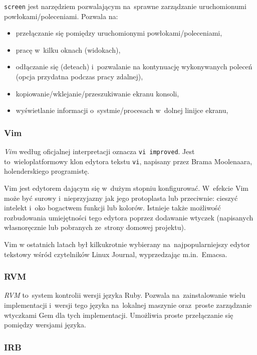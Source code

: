 \texttt{screen}\cite{screen} jest narzędziem pozwalającym na~sprawne zarządzanie uruchomionumi powłokami/poleceniami. Pozwala na:

\begin{itemize}
  \item przełączanie się pomiędzy uruchomionymi powłokami/poleceniami,
  \item pracę w~kilku oknach (widokach),
  \item odłączanie się (deteach) i~pozwalanie na kontynuację wykonywanych poleceń (opcja przydatna podczas pracy zdalnej),
  \item kopiowanie/wklejanie/przeszukiwanie ekranu konsoli,
  \item wyświetlanie informacji o~systmie/procesach w~dolnej linijce ekranu,
\end{itemize}

\subsubsection{Vim}

\textit{Vim}\cite{vim} według oficjalnej interpretacji oznacza \texttt{vi improved}. Jest to~wieloplatformowy klon edytora tekstu \texttt{vi}, napisany przez Brama Moolenaara, holenderskiego programistę.


Vim jest edytorem dającym się w~dużym stopniu konfigurować. W~efekcie Vim może być surowy i~nieprzyjazny jak jego protoplasta lub przeciwnie: cieszyć intelekt i~oko bogactwem funkcji lub kolorów. Istnieje także możliwość rozbudowania umiejętności tego edytora poprzez dodawanie wtyczek (napisanych własnoręcznie lub pobranych ze~strony domowej projektu).


Vim w ostatnich latach był kilkukrotnie wybierany na~najpopularniejszy edytor tekstowy wśród czytelników Linux Journal, wyprzedzając m.in.~Emacsa.

\subsubsection{RVM}

\textit{RVM}\cite{rvm} to~system kontrolii wersji języka Ruby. Pozwala na~zainstalowanie wielu implementacji i~wersji tego języka na~lokalnej maszynie oraz~proste zarządzanie wtyczkami Gem dla tych implementacji. Umożliwia proste przełączanie się pomiędzy wersjami języka.

\subsubsection{IRB}

